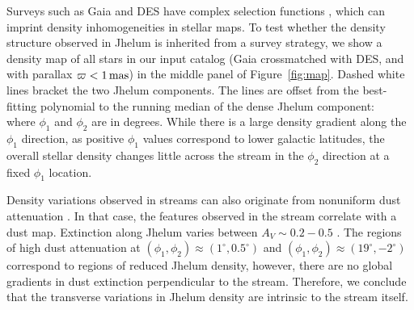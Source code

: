 \documentclass[twocolumn]{aastex62}
\begin{document}
Surveys such as Gaia and DES have complex selection functions \citep[e.g.,][]{bovy2017}, which can imprint density inhomogeneities in stellar maps.
To test whether the density structure observed in Jhelum is inherited from a survey strategy, we show a density map of all stars in our input catalog (Gaia crossmatched with DES, and with parallax $\varpi<1\,\rm mas$) in the middle panel of Figure~\ref{fig:map}.
Dashed white lines bracket the two Jhelum components.
The lines are offset from the best-fitting polynomial to the running median of the dense Jhelum component:
\begin{equation}

\label{eq:track}
\end{equation}
where $\phi_1$ and $\phi_2$ are in degrees.
While there is a large density gradient along the $\phi_1$ direction, as positive $\phi_1$ values correspond to lower galactic latitudes, the overall stellar density changes little across the stream in the $\phi_2$ direction at a fixed $\phi_1$ location.

Density variations observed in streams can also originate from nonuniform dust attenuation \citep[e.g.,][]{ibata2016}.
In that case, the features observed in the stream correlate with a dust map.
Extinction along Jhelum varies between $A_V\sim0.2-0.5$ \citep[Figure~\ref{fig:map}, bottom;][]{sfd}.
The regions of high dust attenuation at $(\phi_1,\phi_2)\approx(1^\circ,0.5^\circ)$ and $(\phi_1,\phi_2)\approx(19^\circ,-2^\circ)$ correspond to regions of reduced Jhelum density, however, there are no global gradients in dust extinction perpendicular to the stream.
Therefore, we conclude that the transverse variations in Jhelum density are intrinsic to the stream itself.
\end{document}
